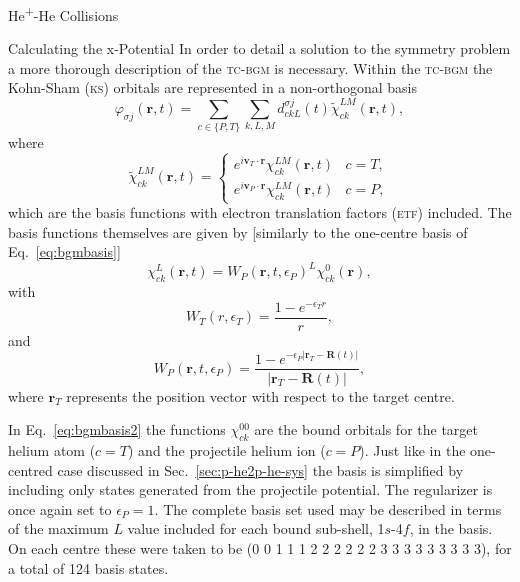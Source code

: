 \documentclass[letterpaper, 11 pt]{report}
\begin{document}
\begin{chapter}{\texorpdfstring{He\textsuperscript{+}}{He+}-He Collisions \label{chap:hephe}}
\begin{section}{Calculating the x-Potential \label{sec:pot}}
      In order to detail a solution to the symmetry problem a more thorough description of the
      \textsc{tc-bgm} is necessary. Within the \textsc{tc-bgm} the Kohn-Sham (\textsc{ks}) orbitals are
      represented in a non-orthogonal basis
      \begin{equation} \label{eq:bgmexp}
         \varphi_{\sigma j}(\mathbf{r},t) = \sum\limits_{c \in \{P, T\}} \sum\limits_{k, L, M}
                               d_{c k L}^{\sigma j}(t) \tilde{\chi}^{LM}_{c k}(\mathbf{r},t),
      \end{equation}
      where
      \begin{equation} \label{eq:etfbasis}
         \tilde{\chi}^{L M}_{ck}(\mathbf{r},t) =
            \begin{cases}
               e^{i \mathbf{v}_T \cdot \mathbf{r}} {\chi}^{L M}_{c k}(\mathbf{r},t) & c = T, \\[2ex]
               e^{i \mathbf{v}_P \cdot \mathbf{r}} {\chi}^{L M}_{c k}(\mathbf{r},t) & c = P,
            \end{cases}
      \end{equation}
      which are the basis functions with electron translation factors (\textsc{etf}) included. The basis
      functions themselves are given by [similarly to the one-centre basis of Eq.~\eqref{eq:bgmbasis}]
      \begin{equation} \label{eq:bgmbasis2}
         \chi^{L}_{ck} (\mathbf{r},t)
         = W_P( \mathbf{r},t, \epsilon_P)^L \chi^{0}_{ck} (\mathbf{r}),
      \end{equation}
      with
      \begin{equation}
         W_T(r,\epsilon_T) = \frac{1 - e^{-\epsilon_T r}}{r},
      \end{equation}
      and
      \begin{equation}
         W_P (\mathbf{r},t,\epsilon_P)
         = \frac{1 - e^{-\epsilon_P|\mathbf{r}_T - \mathbf{R}(t)|}}{|\mathbf{r}_T - \mathbf{R}(t)|},
      \end{equation}
      where $\mathbf{r}_T$ represents the position vector with respect to the target centre.
      
      In Eq.~\eqref{eq:bgmbasis2} the functions $\chi^{00}_{ck}$ are the bound orbitals for the target
      helium atom ($c = T$) and the projectile helium ion ($c = P$). Just like in the one-centred case
      discussed in Sec.~\ref{sec:p-he2p-he-sys} the basis is simplified by including only states
      generated from the projectile potential. The regularizer is once again set to $\epsilon_P = 1$.
      The complete basis set used may be described in terms of the maximum $L$ value included for each
      bound sub-shell, 1$s$-4$f$, in the basis. On each centre these were taken to be (0 0 1 1 1 2 2 2 2
      2 2 3 3 3 3 3 3 3 3 3), for a total of 124 basis states.


\end{section}
\end{chapter}
\end{document}
